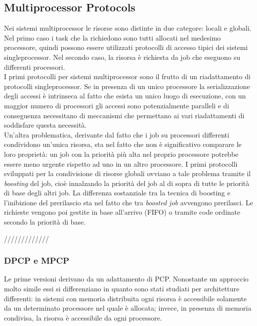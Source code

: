 \subsection{Multiprocessor Protocols}
\label{sec:lockProtocols.multi}

Nei sistemi multiprocessor le risorse sono distinte in due categore: locali e globali. Nel primo caso i task che la richiedono sono tutti allocati nel medesimo processore, quindi possono essere utilizzati protocolli di accesso tipici dei sistemi singleprocessor. Nel secondo caso, la risorsa è richiesta da job che eseguono su differenti processori.\\
I primi protocolli per sistemi multiprocessor sono il frutto di un riadattamento di protocolli singleprocessor. Se in presenza di un unico processore la serializzazione degli accessi è intrinseca al fatto che esista un unico luogo di esecuzione, con un maggior numero di processori gli accessi sono potenzialmente paralleli e di conseguenza necessitano di meccanismi che permettano ai vari riadattamenti di soddisfare questa necessità.\\

Un'altra problematica, derivante dal fatto che i job su processori differenti condividono un'unica risorsa, sta nel fatto che non è significativo comparare le loro proprietà: un job con la priorità più alta nel proprio processore potrebbe essere meno urgente rispetto ad uno in un altro processore. I primi protocolli sviluppati per la condivisione di risorse globali ovviano a tale problema tramite il \textit{boosting} del job, cioè innalzando la priorità del job al di sopra di tutte le priorità di base degli altri job. La differenza sostanziale tra la tecnica di boosting e l'inibizione del prerilascio sta nel fatto che tra \textit{boosted job} avvengono prerilasci. Le richieste vengono poi gestite in base all'arrivo (FIFO) o tramite code ordinate secondo la priorità di base.

/////////////

\subsubsection{DPCP e MPCP}
\label{sec:lockProtocols.dpcp.mpcp}

Le prime versioni derivano da un adattamento di PCP. Nonostante un approccio molto simile essi si differenziano in quanto sono stati studiati per architetture differenti: in sistemi con memoria distribuita ogni risorsa è accessibile solamente da un determinato processore nel quale è allocata; invece, in presenza di memoria condivisa, la risorsa è accessibile da ogni processore.\\

